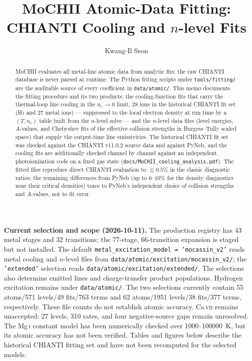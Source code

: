 \documentclass[english,a4paper]{my_memo}
\newcommand{\code}[1]{\texttt{#1}}
\begin{document}
\title{MoCHII Atomic-Data Fitting:\\ CHIANTI Cooling and $n$-level Fits}
\author{Kwang-Il Seon}
\date{\docmoddate}
\maketitle

\begin{abstract}
MoCHII evaluates all metal-line atomic data from analytic fits; the raw
CHIANTI database is never parsed at runtime.  The Python fitting scripts under
\code{tools/fitting/} are the auditable source of every coefficient in
\code{data/atomic/}.  This memo documents the fitting procedure and its two
products: the cooling-function fits that carry the thermal-loop line
cooling in the $n_e \to 0$ limit, 28 ions in the historical CHIANTI fit set (H\,\textsc{i} and
27 metal ions) --- suppressed to the local electron density at run time by a
$(T, n_e)$ table built from the $n$-level solve --- and the $n$-level
data files (level energies, $A$-values, and Chebyshev fits of the
effective collision strengths in Burgess--Tully scaled space) that supply
the output-time line emissivities.  The historical CHIANTI fit set was checked against the
CHIANTI v11.0.2 source data and against PyNeb, and the cooling fits are
additionally checked channel by channel against an independent
photoionization code on a fixed gas state
(\code{docs/MoCHII\_cooling\_analysis.pdf}).
The fitted files reproduce direct CHIANTI evaluation to $\lesssim 0.5\%$ in
the classic diagnostic ratios; the remaining differences from PyNeb
(up to $6$--$10\%$ for the density diagnostics near their critical
densities) trace to PyNeb's independent choice of collision strengths and
$A$-values, not to fit error.
\end{abstract}

\noindent\textbf{Current selection and scope (2026-10-11).}
The production registry has 43 metal stages and 32 transitions; the
77-stage, 66-transition expansion is staged but not installed.  The default
\code{metal\_excitation\_model = 'mocassin\_v2'} reads metal cooling and
$n$-level files from \code{data/atomic/excitation/mocassin\_v2/}; the
\code{'extended'} selection reads \code{data/atomic/excitation/extended/}.
The selections also determine emitted lines and charge-transfer product
populations.  Hydrogen excitation remains under \code{data/atomic/}.
The two selections currently contain 55 atoms/571 levels/49 fits/763 terms
and 62 atoms/1951 levels/38 fits/377 terms, respectively.  These file counts do not establish atomic accuracy.
Ca\,\textsc{vii} remains unaccepted: 27 levels, 310 rates, and four
negative-source gaps remain unresolved.  The Mg\,\textsc{i} constant model
has been numerically checked over 1000--100000~K, but its atomic accuracy
has not been verified.  Tables and figures below describe the historical
CHIANTI fitting set and have not been recomputed for the selected models.
\end{document}
